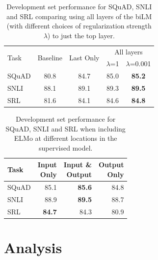 \documentclass[11pt,a4paper]{article}
\newcommand{\ELMO}{ELMo}
\begin{document}
\begin{table}
\centering
\begin{tabular}[t]{l|c|c|cc}
\multirow{2}{*}{Task} & \multirow{2}{*}{Baseline} & \multirow{2}{*}{Last Only} & \multicolumn{2}{c}{All layers} \\ 
 & & & $\lambda$=1 & $\lambda$=0.001 \\ \hline \hline
SQuAD     &     80.8     & 84.7   & 85.0        &      \textbf{85.2} \\
SNLI   &    88.1    & 89.1   & 89.3        &      \textbf{89.5}  \\
SRL    &    81.6     & 84.1   & 84.6        &      \textbf{84.8} \\
\end{tabular}
\caption{Development set performance for SQuAD, SNLI and SRL comparing using all layers of the biLM (with different choices of regularization strength $\lambda$) to just the top layer.}
\label{table:alternate_weights}
\end{table}

\begin{table}
\centering
\begin{tabular}[t]{p{8ex}|r|r|r}
Task & \parbox{8ex}{Input \\ Only} & \parbox{7ex}{Input \& \\ Output} & \parbox{6ex}{Output \\ Only} \\ \hline \hline
SQuAD        & 85.1        & \textbf{85.6}   & 84.8 \\
SNLI         & 88.9        &  \textbf{89.5}  &            88.7  \\
SRL          & \textbf{84.7}        &  84.3  &            80.9  \\
\end{tabular}
\caption{Development set performance for SQuAD, SNLI and SRL when including \ELMO{} at different locations in the supervised model.}
\label{table:where_to_include_elmo}
\end{table}

\section{Analysis}
\end{document}
